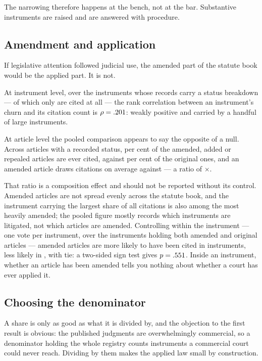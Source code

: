 \documentclass[11pt]{article}
\begin{document}
The narrowing therefore happens at the bench, not at the bar. Substantive
instruments are raised and are answered with procedure.

\subsection{Amendment and application}

If legislative attention followed judicial use, the amended part of the
statute book would be the applied part. It is not.

At instrument level, over the \nChurnInstruments{} instruments whose records
carry a status breakdown --- of which only \nChurnInstrumentsCited{} are cited
at all --- the rank correlation between an instrument's churn and its citation
count is $\rho = .201{}$: weakly positive and carried by a handful
of large instruments.

At article level the pooled comparison appears to say the opposite of a null.
Across \nStatusArticles{} articles with a recorded status,
\nAmendedCitedShare{} per cent of the \nAmendedArticles{} amended, added or
repealed articles are ever cited, against \nOriginalCitedShare{} per cent of
the \nOriginalArticles{} original ones, and an amended article draws
\nAmendedPerArticle{} citations on average against \nOriginalPerArticle{} ---
a ratio of \nAmendedRatio{}$\times$.

That ratio is a composition effect and should not be reported without its
control. Amended articles are not spread evenly across the statute book, and
the instrument carrying the largest share of all citations is also among the
most heavily amended; the pooled figure mostly records which instruments are
litigated, not which articles are amended. Controlling within the instrument
--- one vote per instrument, over the \nWithinInstruments{} instruments
holding both amended and original articles --- amended articles are more
likely to have been cited in \nWithinAmendedHigher{} instruments, less likely
in \nWithinOriginalHigher{}, with \nWithinTied{} tie: a two-sided sign test
gives $p = .551{}$. Inside an instrument, whether an article has been
amended tells you nothing about whether a court has ever applied it.

\subsection{Choosing the denominator}
\label{sec:denominator}

A share is only as good as what it is divided by, and the objection to the
first result is obvious: the published judgments are overwhelmingly
commercial, so a denominator holding the whole registry counts instruments a
commercial court could never reach. Dividing by them makes the applied law
small by construction.
\end{document}
